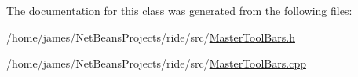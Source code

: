 The documentation for this class was generated from the following files\-:\begin{DoxyCompactItemize}
\item 
/home/james/\-Net\-Beans\-Projects/ride/src/\hyperlink{_master_tool_bars_8h}{Master\-Tool\-Bars.\-h}\item 
/home/james/\-Net\-Beans\-Projects/ride/src/\hyperlink{_master_tool_bars_8cpp}{Master\-Tool\-Bars.\-cpp}\end{DoxyCompactItemize}
